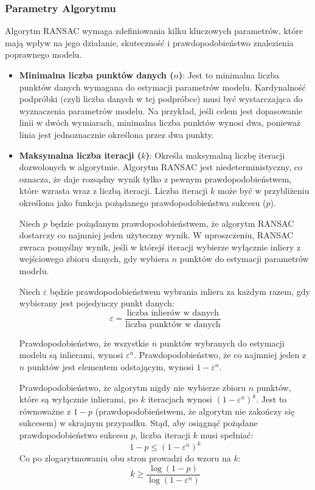 \documentclass[12pt]{article}
\begin{document}
\subsubsection{Parametry Algorytmu}

Algorytm RANSAC wymaga zdefiniowania kilku kluczowych parametrów, które mają wpływ na jego działanie, skuteczność i prawdopodobieństwo znalezienia poprawnego modelu.

\begin{itemize}
    \item \textbf{Minimalna liczba punktów danych ($n$)}: Jest to minimalna liczba punktów danych wymagana do estymacji parametrów modelu. Kardynalność podpróbki (czyli liczba danych w tej podpróbce) musi być wystarczająca do wyznaczenia parametrów modelu. Na przykład, jeśli celem jest dopasowanie linii w dwóch wymiarach, minimalna liczba punktów wynosi dwa, ponieważ linia jest jednoznacznie określona przez dwa punkty.

    \item \textbf{Maksymalna liczba iteracji ($k$)}: Określa maksymalną liczbę iteracji dozwolonych w algorytmie. Algorytm RANSAC jest niedeterministyczny, co oznacza, że daje rozsądny wynik tylko z pewnym prawdopodobieństwem, które wzrasta wraz z liczbą iteracji. Liczba iteracji $k$ może być w przybliżeniu określona jako funkcja pożądanego prawdopodobieństwa sukcesu ($p$).
    
    Niech $p$ będzie pożądanym prawdopodobieństwem, że algorytm RANSAC dostarczy co najmniej jeden użyteczny wynik. W uproszczeniu, RANSAC zwraca pomyślny wynik, jeśli w którejś iteracji wybierze wyłącznie inliery z wejściowego zbioru danych, gdy wybiera $n$ punktów do estymacji parametrów modelu.
    
    Niech $\varepsilon$ będzie prawdopodobieństwem wybrania inliera za każdym razem, gdy wybierany jest pojedynczy punkt danych:
    \begin{equation}
    \varepsilon = \frac{\text{liczba inlierów w danych}}{\text{liczba punktów w danych}}
    \end{equation}
    
    
    Prawdopodobieństwo, że wszystkie $n$ punktów wybranych do estymacji modelu są inlierami, wynosi $\varepsilon^n$. Prawdopodobieństwo, że co najmniej jeden z $n$ punktów jest elementem odstającym, wynosi $1 - \varepsilon^n$.
    
    Prawdopodobieństwo, że algorytm nigdy nie wybierze zbioru $n$ punktów, które są wyłącznie inlierami, po $k$ iteracjach wynosi $(1 - \varepsilon^n)^k$. Jest to równoważne z $1 - p$ (prawdopodobieństwem, że algorytm nie zakończy się sukcesem) w skrajnym przypadku. Stąd, aby osiągnąć pożądane prawdopodobieństwo sukcesu $p$, liczba iteracji $k$ musi spełniać:
    \begin{equation}
    1 - p \le (1 - \varepsilon^n)^k
    \end{equation}
    Co po zlogarytmowaniu obu stron prowadzi do wzoru na $k$:
    \begin{equation}
    k \ge \frac{\log(1 - p)}{\log(1 - \varepsilon^n)}
    \end{equation}
    

\end{itemize}
\end{document}
